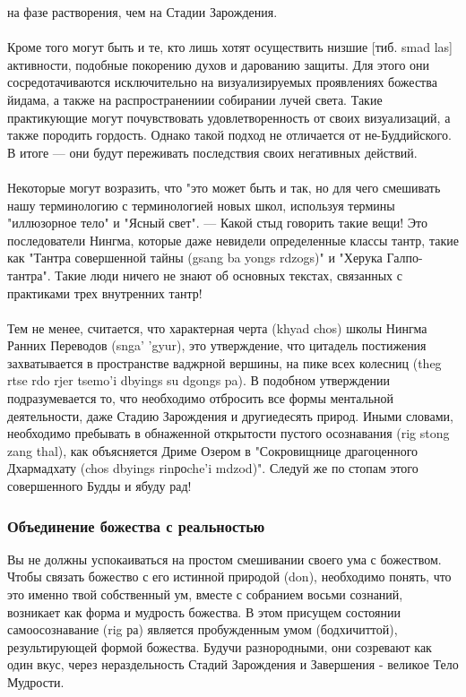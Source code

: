 \begin{siderules}
на фазе растворения, чем на Стадии Зарождения.\\
\\
Кроме того могут быть и те, кто лишь хотят осуществить низшие [тиб. smad las] активности,
подобные покорению духов и дарованию защиты. Для этого они сосредотачиваются
исключительно на визуализируемых проявлениях божества йидама, а также на
распространениии собирании лучей света. Такие практикующие могут почувствовать
удовлетворенность от своих визуализаций, а также породить гордость. Однако такой подход
не отличается от не-Буддийского. В итоге — они будут переживать последствия своих
негативных действий.\\
\\
Некоторые могут возразить, что "это может быть и так, но для чего смешивать нашу
терминологию с терминологией новых школ, используя термины "иллюзорное тело" и
"Ясный свет". — Какой стыд говорить такие вещи! Это последователи Нингма, которые даже
невидели определенные классы тантр, такие как "Тантра совершенной тайны (gsang ba yongs
rdzogs)" и "Херука Галпо-тантра". Такие люди ничего не знают об основных текстах,
связанных с практиками трех внутренних тантр!\\
\\
Тем не менее, считается, что характерная черта (khyad chos) школы Нингма Ранних
Переводов (snga' 'gyur), это утверждение, что цитадель постижения захватывается в
пространстве ваджрной вершины, на пике всех колесниц (theg rtse rdo rjer tsemo'i dbyings su
dgongs pa). В подобном утверждении подразумевается то, что необходимо отбросить все
формы ментальной деятельности, даже Стадию Зарождения и другиедесять природ. Иными
словами, необходимо пребывать в обнаженной открытости пустого осознавания (rig stong
zang thal), как объясняется Дриме Озером в "Сокровищнице драгоценного Дхармадхату (chos
dbyings rinроche'i mdzod)". Следуй же по стопам этого совершенного Будды и ябуду рад!
\end{siderules}

\subsubsection{Объединение божества с реальностью}

Вы не должны успокаиваться на простом смешивании своего ума с божеством. Чтобы
связать божество с его истинной природой (don), необходимо понять, что это именно твой
собственный ум, вместе с собранием восьми сознаний, возникает как форма и мудрость
божества. В этом присущем состоянии самоосознавание (rig ра) является пробужденным
умом (бодхичиттой), результирующей формой божества. Будучи разнородными, они
созревают как один вкус, через нераздельность Стадий Зарождения и Завершения - великое
Тело Мудрости.\\

